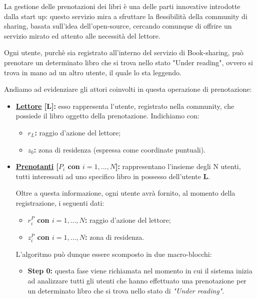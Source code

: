 La gestione delle prenotazioni dei libri è una delle parti innovative introdotte dalla start up: questo servizio mira a sfruttare la flessibilità della community di sharing, basata sull'idea dell'open-source, cercando comunque di offrire un servizio mirato ed attento alle necessità del lettore.

Ogni utente, purchè sia registrato all'interno del servizio di Book-sharing, può prenotare un determinato libro che si trova nello stato "Under reading", ovvero si trova in mano ad un altro utente, il quale lo sta leggendo.

Andiamo ad evidenziare gli attori coinvolti in questa operazione di prenotazione:
\begin{itemize}
	\item \textbf{\underline{Lettore} [L]:} esso rappresenta l'utente, registrato nella community, che possiede il libro oggetto della prenotazione. Indichiamo con:
	\begin{itemize}
		\item \textbf{{\LARGE $r_{L}$}:} raggio d'azione del lettore;
		\item \textbf{{\LARGE $ z_{0} $}:} zona di residenza (espressa come coordinate puntuali).
	\end{itemize}
	\item \textbf{\underline{Prenotanti} [$ P_{i}$ con $i=1,...,N $]:} rappresentano l'insieme degli N utenti, tutti interessati ad uno specifico libro in possesso dell'utente \textbf{L}.
	
	Oltre a questa informazione, ogni utente avrà fornito, al momento della registrazione, i seguenti dati:
	\begin{itemize}
		\item \textbf{{\LARGE $r^{P}_{i}$} con $i=1,...,N $:} raggio d'azione del lettore;
		\item \textbf{{\LARGE $z^{P}_{i}$} con $i=1,...,N $:} zona di residenza.
	\end{itemize}

	L'algoritmo può dunque essere scomposto in due macro-blocchi:
	\begin{itemize}
		\item \textbf{Step 0:} questa fase viene richiamata nel momento in cui il sistema inizia ad analizzare tutti gli utenti che hanno effettuato una prenotazione per un determinato libro che si trova nello stato di \textit{"Under reading"}.
		

\end{itemize}
\end{itemize}
